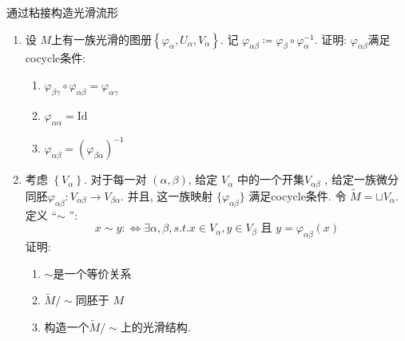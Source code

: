 \documentclass[../main.tex]{subfiles}
\begin{document}
\begin{exercise}{通过粘接构造光滑流形}{}
    \begin{enumerate}
        \item 设 \(  M  \)上有一族光滑的图册\(  \left\{  \varphi _{\alpha },U_{\alpha },V_{ \alpha } \right\}  \). 记 \(   \varphi _{ \alpha \beta }\coloneqq  \varphi _{\beta }\circ  \varphi _{\alpha }^{-1}   \). 证明: \(   \varphi _{\alpha \beta }  \)满足cocycle条件:
        \begin{enumerate}
            \item \(   \varphi _{\beta  \gamma }\circ  \varphi _{\alpha \beta }=  \varphi _{ \alpha  \gamma }  \)
            \item \(   \varphi _{\alpha  \alpha }= \mathrm{Id}  \)
            \item \(   \varphi _{\alpha \beta }= \left(  \varphi _{\beta \alpha } \right)^{-1}    \)   
        \end{enumerate}
        \item 考虑 \(  \left\{ V_{\alpha } \right\}  \). 对于每一对 $(\alpha, \beta)$, 给定 $V_\alpha$ 中的一个开集\(  V_{\alpha \beta }  \) , 给定一族微分同胚$\varphi_{\alpha\beta}: V_{\alpha\beta} \to V_{\beta\alpha}$. 并且, 这一族映射 $\{\varphi_{\alpha\beta}\}$ 满足cocycle条件. 令 \(  \tilde{M}=  \sqcup V_{\alpha }  \). 定义 ``\(  \sim   \) '': \[
        x\sim y:\iff \exists \alpha ,\beta , s.t. x\in V_{\alpha }, y \in V_{\beta } \text{ 且 } y=  \varphi _{\alpha \beta }\left( x \right) 
        \]  证明:
        \begin{enumerate}
            \item \(  \sim   \)是一个等价关系
            \item \(  \tilde{M}/\sim   \)同胚于 \(  M  \)
            \item 构造一个\(  \tilde{M}/\sim   \)上的光滑结构.    
        \end{enumerate}
        
            
    \end{enumerate}
    
\end{exercise}
\end{document}
